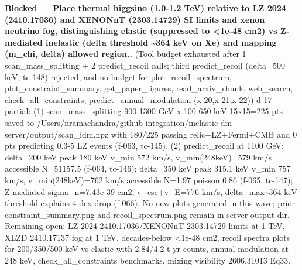 \documentclass[11pt,a4paper]{article}
\begin{document}
\textbf{Blocked --- Place thermal higgsino (1.0-1.2 TeV) relative to LZ 2024 (2410.17036) and XENONnT (2303.14729) SI limits and xenon neutrino fog, distinguishing elastic (suppressed to \textless{}1e-48 cm2) vs Z-mediated inelastic (delta threshold \textasciitilde{}364 keV on Xe) and mapping (m\_chi, delta) allowed region..} (Tool budget exhausted after 1 scan\_mass\_splitting + 2 predict\_recoil calls; third predict\_recoil (delta=500 keV, tc-148) rejected, and no budget for plot\_recoil\_spectrum, plot\_constraint\_summary, get\_paper\_figures, read\_arxiv\_chunk, web\_search, check\_all\_constraints, predict\_annual\_modulation (x-20,x-21,x-22)) d-17 partial: (1) scan\_mass\_splitting 900-1300 GeV x 100-650 keV 15x15=225 pts saved to /Users/nramachandra/github-integration/inelastic-dm-server/output/scan\_idm.npz with 180/225 passing relic+LZ+Fermi+CMB and 0 pts predicting 0.3-5 LZ events (f-063, tc-145). (2) predict\_recoil at 1100 GeV: delta=200 keV peak 180 keV v\_min 572 km/s, v\_min(248keV)=579 km/s accessible N=51157.5 (f-064, tc-146); delta=350 keV peak 315.1 keV v\_min 757 km/s, v\_min(248keV)=762 km/s accessible N=1.97 poisson 0.86 (f-065, tc-147); Z-mediated sigma\_n=7.43e-39 cm2, v\_esc+v\_E=776 km/s, delta\_max\textasciitilde{}364 keV threshold explains 4-dex drop (f-066). No new plots generated in this wave; prior constraint\_summary.png and recoil\_spectrum.png remain in server output dir. Remaining open: LZ 2024 2410.17036/XENONnT 2303.14729 limits at 1 TeV, XLZD 2410.17137 fog at 1 TeV, decades-below \textless{}1e-48 cm2, recoil spectra plots for 200/350/500 keV vs elastic with 2.84/4.2 t-yr counts, annual modulation at 248 keV, check\_all\_constraints benchmarks, mixing visibility 2606.31013 Eq33.
\end{document}
